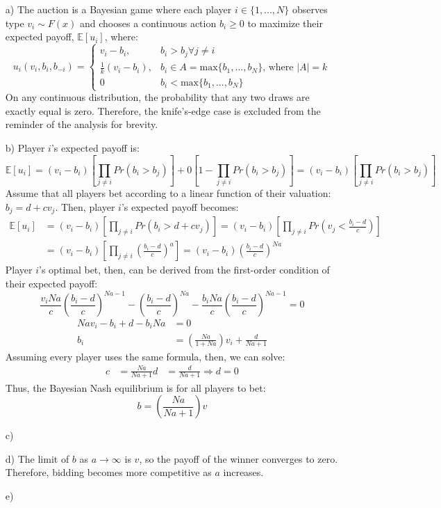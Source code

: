\documentclass{article}
\newcommand{\E}[1]{\mathbb{E}\left[#1\right]} %
\begin{document}
\begin{itemize}
	\item[a)] The auction is a Bayesian game where each player ${i\in\{1,...,N\}}$ observes type ${v_i\sim F(x)}$ and chooses a continuous action ${b_i\geq 0}$ to maximize their expected payoff, $\E{u_i}$, where:
		\[
			u_i(v_i,b_i,b_{-i}) =	\begin{cases}
										v_i - b_i, 				&b_i>b_j \forall j\neq i												\\
										\frac{1}{k}(v_i-b_i), 	&b_i\in A=\text{max}\{b_1,...,b_N\} \text{, where }|A|=k 	\\
										0						&b_i < \text{max}\{b_1,...,b_N\}
									\end{cases}
		\]
		On any continuous distribution, the probability that any two draws are exactly equal is zero. Therefore, the knife's-edge case is excluded from the reminder of the analysis for brevity.

	
	\item[b)] Player $i$'s expected payoff is:
		\[
			\E{u_i} = (v_i - b_i)\left[\prod_{j\neq i}Pr(b_i>b_j)\right] + 0\left[1-\prod_{j\neq i}Pr(b_i>b_j)\right] = (v_i - b_i)\left[\prod_{j\neq i}Pr(b_i>b_j)\right]
		\]
		Assume that all players bet according to a linear function of their valuation: ${b_j = d + cv_j}$. Then, player $i$'s expected payoff becomes:
		\begin{align*}
			\E{u_i} &= (v_i - b_i)\left[\prod_{j\neq i}Pr(b_i>d + cv_j)\right] = (v_i - b_i)\left[\prod_{j\neq i}Pr\left(v_j < \frac{b_i-d}{c}\right)\right]	\\
					&= (v_i - b_i)\left[\prod_{j\neq i}\left(\frac{b_i-d}{c}\right)^a\right] = (v_i - b_i)\left(\frac{b_i-d}{c}\right)^{Na}
		\end{align*}
		Player $i$'s optimal bet, then, can be derived from the first-order condition of their expected payoff:
		$$	\frac{v_iNa}{c}\left(\frac{b_i-d}{c}\right)^{Na-1} - \left(\frac{b_i-d}{c}\right)^{Na} - \frac{b_iNa}{c}\left(\frac{b_i-d}{c}\right)^{Na-1} = 0 $$
		\begin{align*}
			Nav_i - b_i + d - b_iNa  &= 0								\\
			b_i &= \left(\frac{Na}{1 + Na}\right)v_i + \frac{d}{Na + 1}
		\end{align*}
		Assuming every player uses the same formula, then, we can solve:
		\begin{align*}
			c &= \frac{Na}{Na + 1}
			d &= \frac{d}{Na + 1}\Rightarrow d=0
		\end{align*}
		Thus, the Bayesian Nash equilibrium is for all players to bet:
			\[
				b = \left(\frac{Na}{Na+1}\right)v
			\]
			
	\item[c)] 


	\item[d)] The limit of $b$ as ${a\rightarrow\infty}$ is $v$, so the payoff of the winner converges to zero. Therefore, bidding becomes more competitive as $a$ increases.


	\item[e)] 


\end{itemize}
\end{document}
